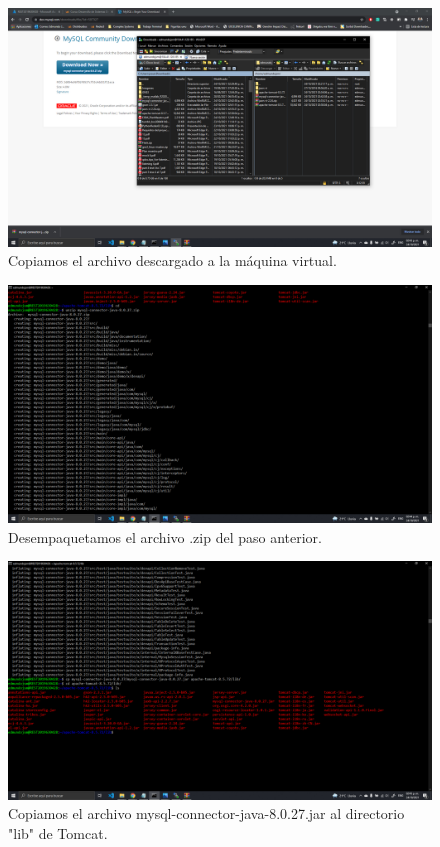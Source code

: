 \documentclass[11pt]{article}
\begin{document}
		\begin{figure}[H]
			\centering
			\includegraphics[scale=0.34]{resources/p12.1.png}
			\caption{Copiamos el archivo descargado a la máquina virtual.}\label{fig:picture}
		\end{figure}
		\begin{figure}[H]
			\centering
			\includegraphics[scale=0.34]{resources/p12.2.png}
			\caption{Desempaquetamos el archivo .zip del paso anterior.}\label{fig:picture}
		\end{figure}
		\begin{figure}[H]
			\centering
			\includegraphics[scale=0.34]{resources/p12.3.png}
			\caption{Copiamos el archivo mysql-connector-java-8.0.27.jar al directorio "lib" de Tomcat.}\label{fig:picture}
		\end{figure}
\end{document}
